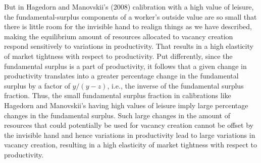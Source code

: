 But in Hagedorn and Manovskii's (2008)  calibration with a high value of
leisure,
the fundamental-surplus components of a worker's outside
value are so small that there is little room for the invisible hand to  realign things as we have described,
making the equilibrium amount
of resources allocated to vacancy creation respond
sensitively to variations in productivity.
That  results in a high
elasticity of market tightness with respect to productivity. Put
differently, since the fundamental surplus is a part of
productivity, it follows that a given change
in productivity translates into  a greater percentage change in
the fundamental surplus by a factor of $y/(y-z)$, i.e., the
inverse of the fundamental surplus fraction. Thus, the small
fundamental surplus fraction in  calibrations
like Hagedorn and Manovskii's having high values of leisure imply large percentage
changes in the fundamental surplus. Such large changes in the
amount of resources that could potentially be used for
vacancy creation cannot be offset by the invisible hand
and hence variations in productivity lead to
large variations in vacancy creation, resulting in a high
elasticity of market tightness with respect to
productivity.


